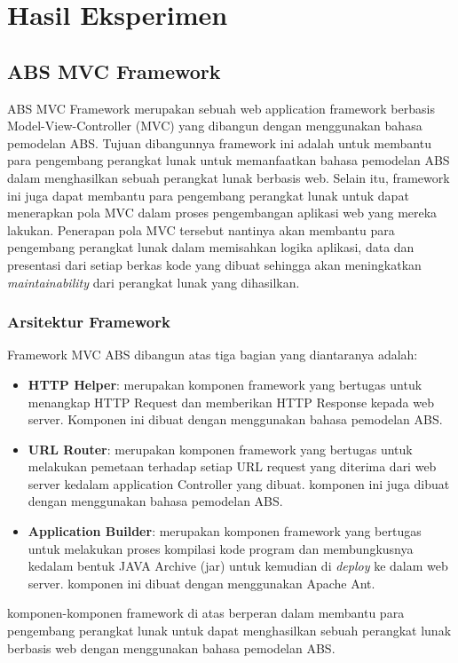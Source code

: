 \chapter{Hasil Eksperimen}

\section{ABS MVC Framework}
ABS MVC Framework merupakan sebuah web application framework berbasis Model-View-Controller (MVC) yang dibangun dengan menggunakan bahasa pemodelan ABS. Tujuan dibangunnya framework ini adalah untuk membantu para pengembang perangkat lunak untuk memanfaatkan bahasa pemodelan ABS dalam menghasilkan sebuah perangkat lunak berbasis web. Selain itu, framework ini juga dapat membantu para pengembang perangkat lunak untuk dapat menerapkan pola MVC dalam proses pengembangan aplikasi web yang mereka lakukan. Penerapan pola MVC tersebut nantinya akan membantu para pengembang perangkat lunak dalam memisahkan logika aplikasi, data dan presentasi dari setiap berkas kode yang dibuat sehingga akan meningkatkan \textit{maintainability} dari perangkat lunak yang dihasilkan.

\subsection{Arsitektur Framework}
Framework MVC ABS dibangun atas tiga bagian yang diantaranya adalah:
\begin{itemize}
    \item \textbf{HTTP Helper}: merupakan komponen framework yang bertugas untuk menangkap HTTP Request dan memberikan HTTP Response kepada web server. Komponen ini dibuat dengan menggunakan bahasa pemodelan ABS.
    \item \textbf{URL Router}: merupakan komponen framework yang bertugas untuk melakukan pemetaan terhadap setiap URL request yang diterima dari web server kedalam application Controller yang dibuat. komponen ini juga dibuat dengan menggunakan bahasa pemodelan ABS.
    \item \textbf{Application Builder}: merupakan komponen framework yang bertugas untuk melakukan proses kompilasi kode program dan membungkusnya kedalam bentuk JAVA Archive (jar) untuk kemudian di \textit{deploy} ke dalam web server. komponen ini dibuat dengan menggunakan Apache Ant.
\end{itemize}

\noindent
komponen-komponen framework di atas berperan dalam membantu para pengembang perangkat lunak untuk dapat menghasilkan sebuah perangkat lunak berbasis web dengan menggunakan bahasa pemodelan ABS.

